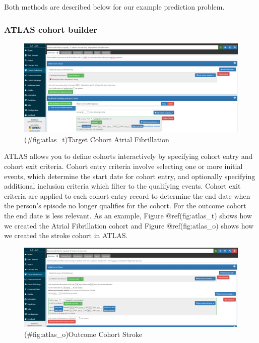 \documentclass[]{book}
\begin{document}
Both methods are described below for our example prediction problem.

\subsubsection{ATLAS cohort builder}\label{atlas-cohort-builder}

\begin{figure}
\centering
\includegraphics{images/PatientLevelPrediction/atlas_t.png}
\caption{(\#fig:atlas\_t)Target Cohort Atrial Fibrillation}
\end{figure}

ATLAS allows you to define cohorts interactively by specifying cohort
entry and cohort exit criteria. Cohort entry criteria involve selecting
one or more initial events, which determine the start date for cohort
entry, and optionally specifying additional inclusion criteria which
filter to the qualifying events. Cohort exit criteria are applied to
each cohort entry record to determine the end date when the person's
episode no longer qualifies for the cohort. For the outcome cohort the
end date is less relevant. As an example, Figure @ref(fig:atlas\_t)
shows how we created the Atrial Fibrillation cohort and Figure
@ref(fig:atlas\_o) shows how we created the stroke cohort in ATLAS.

\begin{figure}
\centering
\includegraphics{images/PatientLevelPrediction/atlas_o.png}
\caption{(\#fig:atlas\_o)Outcome Cohort Stroke}
\end{figure}
\end{document}

